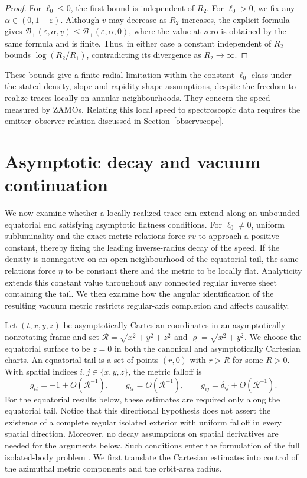 \documentclass[amsmath,amsfonts,amssymb,aps,pra,superscriptaddress,10pt]{revtex4-2}
\numberwithin{equation}{section}
\theoremstyle{plain}
\theoremstyle{definition}
\theoremstyle{remark}
\theoremstyle{definition}
\newcommand{\ellzero}{\ell_0}
\begin{document}
\begin{proof}
For $\ellzero\leq 0$, the first bound is independent of $R_2$. For $\ellzero>0$, we fix any $\alpha\in(0,1-\varepsilon)$. Although $\underline{v}$ may decrease as $R_2$ increases, the explicit formula gives $\mathcal{B}_+(\varepsilon,\alpha,\underline{v})\leq\mathcal{B}_+(\varepsilon,\alpha,0)$, where the value at zero is obtained by the same formula and is finite. Thus, in either case a constant independent of $R_2$ bounds $\log{(R_2/R_1)}$, contradicting its divergence as $R_2\to\infty$.
\end{proof}

These bounds give a finite radial limitation within the constant-$\ellzero$ class under the stated density, slope and rapidity-shape assumptions, despite the freedom to realize traces locally on annular neighbourhoods. They concern the speed measured by ZAMOs.  Relating this local speed to spectroscopic data requires the emitter–observer relation discussed in Section~\ref{observscope}.


\section{Asymptotic decay and vacuum continuation}\label{asymptconstraint}

We now examine whether a locally realized trace can extend along an unbounded equatorial end satisfying asymptotic flatness conditions. For $\ellzero\neq 0$, uniform subluminality and the exact metric relations force $rv$ to approach a positive constant, thereby fixing the leading inverse-radius decay of the speed. If the density is nonnegative on an open neighbourhood of the equatorial tail, the same relations force $\eta$ to be constant there and the metric to be locally flat. Analyticity extends this constant value throughout any connected regular inverse sheet containing the tail. We then examine how the angular identification of the resulting vacuum metric restricts regular-axis completion and affects causality.

Let $(t,x,y,z)$ be asymptotically Cartesian coordinates in an asymptotically nonrotating frame and set $\mathcal{R}=\sqrt{x^2+y^2+z^2}$ and $\varrho=\sqrt{x^2+y^2}$. We choose the equatorial surface to be $z=0$ in both the canonical and asymptotically Cartesian charts. An equatorial tail is a set of points $(r,0)$ with $r>R$ for some $R>0$. With spatial indices $i,j\in\{x,y,z\}$, the metric falloff is
\begin{equation}\label{afcartfalloff}
g_{tt}=-1+O(\mathcal R^{-1}),\qquad
g_{ti}=O(\mathcal R^{-1}),\qquad
g_{ij}=\delta_{ij}+O(\mathcal R^{-1}).
\end{equation}
For the equatorial results below, these estimates are required only along the equatorial tail. Notice that this directional hypothesis does not assert the existence of a complete regular isolated exterior with uniform falloff in every spatial direction. Moreover, no decay assumptions on spatial derivatives are needed for the arguments below. Such conditions enter the formulation of the full isolated-body problem \cite{Regge1974AnnPhys,BeigSimon1980GRG,Beig1987AnnPhys}. We first translate the Cartesian estimates into control of the azimuthal metric components and the orbit-area radius.
\end{document}
